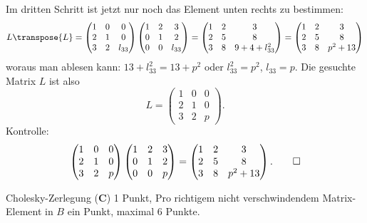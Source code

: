 \begin{loesung}
Im dritten Schritt ist jetzt nur noch das Element unten rechts zu bestimmen:
\[
L\transpose{L}=
\begin{pmatrix}
1&0&     0\\
2&1&     0\\
3&2&l_{33}
\end{pmatrix}
\begin{pmatrix}
1&2&     3\\
0&1&     2\\
0&0&l_{33}
\end{pmatrix}
=
\begin{pmatrix}
 1& 2&  3\\
 2& 5&  8\\
 3& 8&9+4+l_{33}^2
\end{pmatrix}
=
\begin{pmatrix}
 1&2&3\\
 2&5&8\\
 3&8&p^2 + 13
\end{pmatrix}
\]
woraus man ablesen kann: $13+l_{33}^2=13+p^2$ oder $l_{33}^2=p^2$, $l_{33}=p$.
Die gesuchte Matrix $L$ ist also
\[
L=
\begin{pmatrix}
1&0&0\\
2&1&0\\
3&2&p
\end{pmatrix}.
\]
Kontrolle:
\[
\begin{pmatrix}
1&0&0\\
2&1&0\\
3&2&p
\end{pmatrix}
\begin{pmatrix}
1&2&3\\
0&1&2\\
0&0&p
\end{pmatrix}
=
\begin{pmatrix}
 1&2&3\\
 2&5&8\\
 3&8&p^2 + 13
\end{pmatrix}.
\qedhere
\]
\end{loesung}

\begin{bewertung}
Cholesky-Zerlegung ({\bf C}) 1 Punkt,
Pro richtigem nicht verschwindendem Matrix-Element in $B$ ein Punkt,
maximal 6 Punkte.
\end{bewertung}

